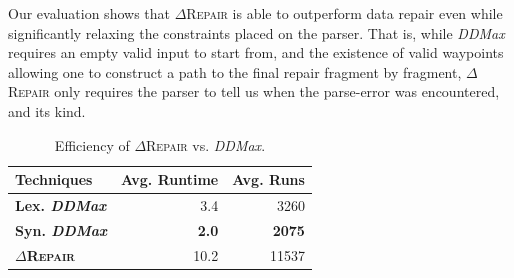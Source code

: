 \documentclass[sigconf,review,anonymous]{acmart}
\newcounter{todocounter}
\newcommand{\todo}[1]{\marginpar{$|$}\textcolor{red}{\stepcounter{todocounter}\footnote[\thetodocounter]{\textcolor{red}{\textbf{TODO }}\textit{#1}}}}
\renewcommand{\todo}[1]{}
\newcommand{\dtask}{data repair\xspace}
\newcommand{\approach}{\textsc{$\Delta$Repair}\xspace}
\newcommand{\ddmax}{\textit{DDMax}\xspace}
\newcommand{\drepair}{\approach}
\begin{document}

Our evaluation shows that \drepair is able to outperform 
\dtask even while significantly relaxing the constraints placed on the parser.
That is, while \ddmax requires an empty valid input to start from, and the
existence of valid waypoints allowing one to construct a path to the final
repair fragment by fragment, \drepair only requires the parser to tell us when
the parse-error was encountered, and its kind.


\begin{table}[!bp]\centering
\caption{Efficiency of \approach vs. \ddmax. 
}
\begin{tabular}{|l | r | r |}
\hline
\textbf{Techniques} %
&  \textbf{Avg. Runtime}  & \textbf{Avg. Runs}  \\
\hline
\textbf{Lex. \ddmax} & 3.4 & 3260 \\
\textbf{Syn. \ddmax} & \textbf{2.0} & \textbf{2075}  \\
\textbf{\approach} &  10.2 & 11537 \\
\hline
\end{tabular}
\label{tab:efficiency}
\end{table}
\end{document}
